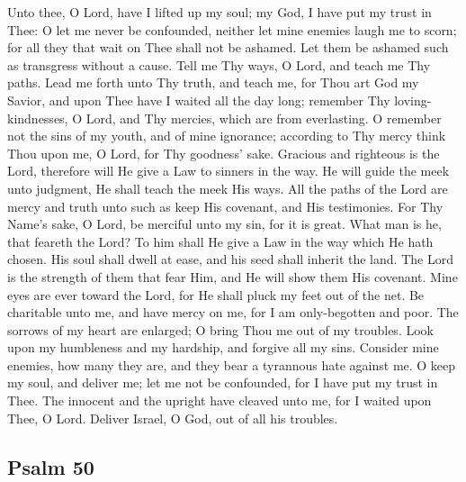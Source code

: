 Unto thee, O Lord, have I lifted up my soul; my God, I have put my trust in Thee: O let me never be confounded, neither let mine enemies laugh me to scorn; for all they that wait on Thee shall not be ashamed. Let them be ashamed such as transgress without a cause. Tell me Thy ways, O Lord, and teach me Thy paths. Lead me forth unto Thy truth, and teach me, for Thou art God my Savior, and upon Thee have I waited all the day long; remember Thy loving-kindnesses, O Lord, and Thy mercies, which are from everlasting. O remember not the sins of my youth, and of mine ignorance; according to Thy mercy think Thou upon me, O Lord, for Thy goodness’ sake. Gracious and righteous is the Lord, therefore will He give a Law to sinners in the way. He will guide the meek unto judgment, He shall teach the meek His ways. All the paths of the Lord are mercy and truth unto such as keep His covenant, and His testimonies. For Thy Name’s sake, O Lord, be merciful unto my sin, for it is great. What man is he, that feareth the Lord? To him shall He give a Law in the way which He hath chosen. His soul shall dwell at ease, and his seed shall inherit the land. The Lord is the strength of them that fear Him, and He will show them His covenant. Mine eyes are ever toward the Lord, for He shall pluck my feet out of the net. Be charitable unto me, and have mercy on me, for I am only-begotten and poor. The sorrows of my heart are enlarged; O bring Thou me out of my troubles. Look upon my humbleness and my hardship, and forgive all my sins. Consider mine enemies, how many they are, and they bear a tyrannous hate against me. O keep my soul, and deliver me; let me not be confounded, for I have put my trust in Thee. The innocent and the upright have cleaved unto me, for I waited upon Thee, O Lord. Deliver Israel, O God, out of all his troubles.

\subsection{Psalm 50}

